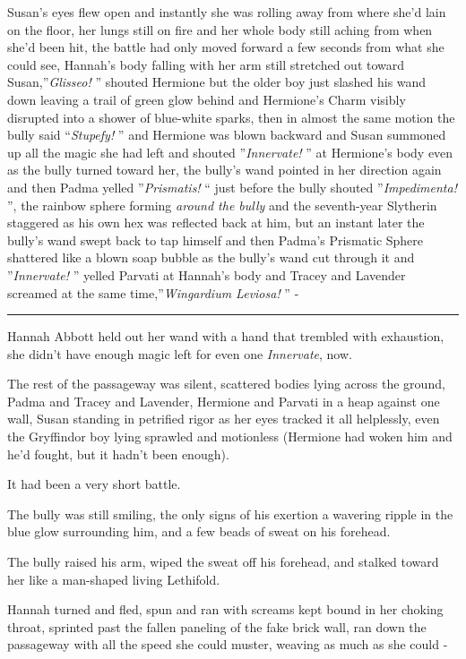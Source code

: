 Susan's eyes flew open and instantly she was rolling away from where
she'd lain on the floor, her lungs still on fire and her whole body
still aching from when she'd been hit, the battle had only moved forward
a few seconds from what she could see, Hannah's body falling with her
arm still stretched out toward Susan,''\emph{Glisseo!} '' shouted
Hermione but the older boy just slashed his wand down leaving a trail of
green glow behind and Hermione's Charm visibly disrupted into a shower
of blue-white sparks, then in almost the same motion the bully said
``\emph{Stupefy!} '' and Hermione was blown backward and Susan summoned up
all the magic she had left and shouted ''\emph{Innervate!} '' at
Hermione's body even as the bully turned toward her, the bully's wand
pointed in her direction again and then Padma yelled ''\emph{Prismatis!}
`` just before the bully shouted ''\emph{Impedimenta!} '', the rainbow
sphere forming \emph{around the bully} and the seventh-year Slytherin
staggered as his own hex was reflected back at him, but an instant later
the bully's wand swept back to tap himself and then Padma's Prismatic
Sphere shattered like a blown soap bubble as the bully's wand cut
through it and ''\emph{Innervate!} '' yelled Parvati at Hannah's body and
Tracey and Lavender screamed at the same time,''\emph{Wingardium
Leviosa!} '' -

\begin{center}\rule{3in}{0.4pt}\end{center}

Hannah Abbott held out her wand with a hand that trembled with
exhaustion, she didn't have enough magic left for even one
\emph{Innervate}, now.

The rest of the passageway was silent, scattered bodies lying across the
ground, Padma and Tracey and Lavender, Hermione and Parvati in a heap
against one wall, Susan standing in petrified rigor as her eyes tracked
it all helplessly, even the Gryffindor boy lying sprawled and motionless
(Hermione had woken him and he'd fought, but it hadn't been enough).

It had been a very short battle.

The bully was still smiling, the only signs of his exertion a wavering
ripple in the blue glow surrounding him, and a few beads of sweat on his
forehead.

The bully raised his arm, wiped the sweat off his forehead, and stalked
toward her like a man-shaped living Lethifold.

Hannah turned and fled, spun and ran with screams kept bound in her
choking throat, sprinted past the fallen paneling of the fake brick
wall, ran down the passageway with all the speed she could muster,
weaving as much as she could -

